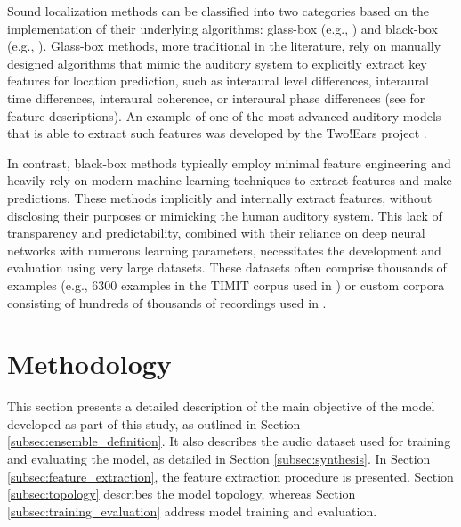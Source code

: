 \documentclass{article}
\begin{document}
Sound localization methods can be classified into two categories based on the implementation of their underlying algorithms: glass-box (e.g., \cite{dietz_auditory_2011, may_probabilistic_2011, may_binaural_2012, may_robust_2015, woodruff_binaural_2012, ma16c_interspeech, ma_exploiting_2017, ma_robust_2018}) and black-box (e.g., \cite{vecchiotti19, vera-diaz_towards_2018, yang_deepear_2022}). Glass-box methods, more traditional in the literature, rely on manually designed algorithms that mimic the auditory system to explicitly extract key features for location prediction, such as interaural level differences, interaural time differences, interaural coherence, or interaural phase differences (see \cite{blauert_spatial_1996} for feature descriptions). An example of one of the most advanced auditory models that is able to extract such features was developed by the Two!Ears project \cite{raake_computational_nodate}.

In contrast, black-box methods typically employ minimal feature engineering and heavily rely on modern machine learning techniques to extract features and make predictions. These methods implicitly and internally extract features, without disclosing their purposes or mimicking the human auditory system. This lack of transparency and predictability, combined with their reliance on deep neural networks with numerous learning parameters, necessitates the development and evaluation using very large datasets. These datasets often comprise thousands of examples (e.g., 6300 examples in the TIMIT corpus \cite{garofolo_john_s_timit_1993} used in \cite{yang_deepear_2022, benaroya_binaural_2018, wang_binaural_2020, vecchiotti19, ma_exploiting_2017, pang_multitask_2019, ma_robust_2018, may_robust_2015}) or custom corpora consisting of hundreds of thousands of recordings used in \cite{antoniuk2023blind, zielinski_automatic_2022, zielinski_spatial_2022, zielinski_comparison_2020}.

\section{Methodology}
\label{sec:methodology}

This section presents a detailed description of the main objective of the model developed as part of this study, as outlined in Section \ref{subsec:ensemble_definition}. It also describes the audio dataset used for training and evaluating the model, as detailed in Section \ref{subsec:synthesis}. In Section \ref{subsec:feature_extraction}, the feature extraction procedure is presented. Section \ref{subsec:topology} describes the model topology, whereas Section \ref{subsec:training_evaluation} address model training and evaluation.
\end{document}
